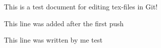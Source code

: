 \documentclass[10pt,conference]{IEEEtran}
\begin{document}
This is a test document for editing tex-files in Git!

This line was added after the first push

This line was written by me
test
\end{document}
